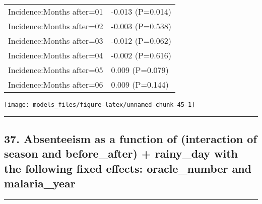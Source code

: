 \documentclass[]{article}
\begin{document}
\begin{longtable}[t]{ll}
\hspace{1em}Incidence:Months after=01 & -0.013 (P=0.014)\\
\hspace{1em}Incidence:Months after=02 & -0.003 (P=0.538)\\
\hspace{1em}Incidence:Months after=03 & -0.012 (P=0.062)\\
\hspace{1em}Incidence:Months after=04 & -0.002 (P=0.616)\\
\hspace{1em}Incidence:Months after=05 & 0.009 (P=0.079)\\
\hspace{1em}Incidence:Months after=06 & 0.009 (P=0.144)\\*
\end{longtable}

\begin{center}\texttt{[image: models\_files/figure-latex/unnamed-chunk-45-1]} \end{center}

\newpage

\begin{center}\rule{0.5\linewidth}{\linethickness}\end{center}

\subsection{37. Absenteeism as a function of (interaction of season and
before\_after) + rainy\_day with the following fixed effects:
oracle\_number and
malaria\_year}\label{absenteeism-as-a-function-of-interaction-of-season-and-before_after-rainy_day-with-the-following-fixed-effects-oracle_number-and-malaria_year}

\begin{center}\rule{0.5\linewidth}{\linethickness}\end{center}
\end{document}
